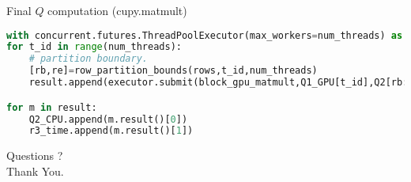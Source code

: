 \documentclass{beamer}
\begin{document}
\begin{frame}[fragile]{Final $Q$ computation (cupy.matmult)}
    \begin{table}[!tbhp]
        \begin{center}
        \end{center}
        \caption{Table presents the predicted MM runtime based on the empirically compute bandwidths and flops/s for matrix rows of $\frac{m}{p} \times n$, where $p$ denotes the number of GPUs used for the actual computation. The difference between the predicted and the reported runtime grows with $\frac{m}{p}$. \label{tb:mm}}
    \end{table}   
    \pause
    \begin{lstlisting}[language=Python, basicstyle=\tiny]
with concurrent.futures.ThreadPoolExecutor(max_workers=num_threads) as executor:
for t_id in range(num_threads):
    # partition boundary. 
    [rb,re]=row_partition_bounds(rows,t_id,num_threads)
    result.append(executor.submit(block_gpu_matmult,Q1_GPU[t_id],Q2[rb:re,:],t_id,loc))

for m in result:
    Q2_CPU.append(m.result()[0])
    r3_time.append(m.result()[1])
    \end{lstlisting}
\end{frame}


\begin{frame}
    \begin{center}
        \Large Questions ?\\
        \Large Thank You. 
    \end{center}
\end{frame}
\end{document}
